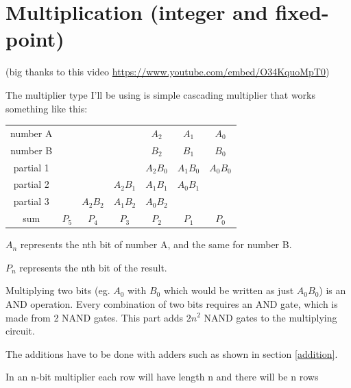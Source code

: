 \documentclass[a4paper]{article}
\begin{document}
	\pagebreak
	
	\section{Multiplication (integer and fixed-point)}
	
	(big thanks to this video \href{https://www.youtube.com/embed/O34KquoMpT0}{https://www.youtube.com/embed/O34KquoMpT0})
	
	\medskip
	
	The multiplier type I'll be using is simple cascading multiplier that works something like this:
	
	\begin{center}
		\begin{tabular}{c | c | c | c | c | c | c |}
			number A 	& & & & $A_2$ & $A_1$ & $A_0$ \\
			number B 	& & & & $B_2$ & $B_1$ & $B_0$ \\\hline
			partial 1	& & & & $A_2B_0$ & $A_1B_0$ & $A_0B_0$ \\
			partial 2	& & & $A_2B_1$ & $A_1B_1$ & $A_0B_1$ & \\
			partial 3	& & $A_2B_2$ & $A_1B_2$ & $A_0B_2$ & & \\\hline
			sum			& $P_5$ & $P_4$ & $P_3$ & $P_2$ & $P_1$ & $P_0$ \\
		\end{tabular}
	\end{center}
	
	$A_n$ represents the nth bit of number A, and the same for number B.
	
	$P_n$ represents the nth bit of the result.
	
	\medskip
	
	Multiplying two bits (eg. $A_0$ with $B_0$ which would be written as just $A_0B_0$) is an AND operation. Every combination of two bits requires an AND gate, which is made from 2 NAND gates. This part adds $2n^2$ NAND gates to the multiplying circuit.
	
	\medskip
	
	The additions have to be done with adders such as shown in section \ref{addition}.
	
	In an n-bit multiplier each row will have length n and there will be n rows
	
\end{document}
